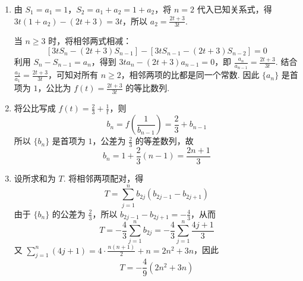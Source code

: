 \begin{solution}
\begin{enumerate}
\item 由 \(S_1=a_1=1\)，\(S_2=a_1+a_2=1+a_2\)，将 \(n=2\) 代入已知关系式，得 \(3t(1+a_2)-(2t+3)=3t\)，所以 \(a_2=\frac{2t+3}{3t}\).

当 \(n\geqslant3\) 时，将相邻两式相减：
\[
\left[3tS_n-(2t+3)S_{n-1}\right]-\left[3tS_{n-1}-(2t+3)S_{n-2}\right]=0
\]
利用 \(S_n-S_{n-1}=a_n\)，得到 \(3ta_n-(2t+3)a_{n-1}=0\)，即 \(\frac{a_n}{a_{n-1}}=\frac{2t+3}{3t}\). 结合 \(\frac{a_2}{a_1}=\frac{2t+3}{3t}\)，可知对所有 \(n\geqslant2\)，相邻两项的比都是同一个常数. 因此 \(\{a_n\}\) 是首项为 \(1\)，公比为 \(f(t)=\frac{2t+3}{3t}\) 的等比数列.
\item 将公比写成 \(f(t)=\frac23+\frac1t\)，则
\[
b_n=f\left(\frac1{b_{n-1}}\right)=\frac23+b_{n-1}
\]
所以 \(\{b_n\}\) 是首项为 \(1\)，公差为 \(\frac23\) 的等差数列，故
\[
b_n=1+\frac23(n-1)=\frac{2n+1}{3}
\]
\item 设所求和为 \(T\). 将相邻两项配对，得
\[
T=\sum_{j=1}^{n}b_{2j}\left(b_{2j-1}-b_{2j+1}\right)
\]
由于 \(\{b_n\}\) 的公差为 \(\frac23\)，所以 \(b_{2j-1}-b_{2j+1}=-\frac43\)，从而
\[
T=-\frac43\sum_{j=1}^{n}b_{2j}=-\frac43\sum_{j=1}^{n}\frac{4j+1}{3}
\]
又 \(\sum_{j=1}^{n}(4j+1)=4\cdot\frac{n(n+1)}2+n=2n^2+3n\)，因此
\[
T=-\frac49(2n^2+3n)
\]
\end{enumerate}
\end{solution}
